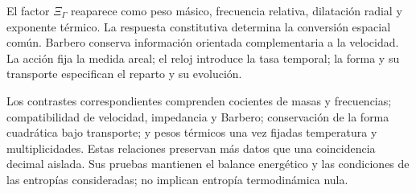 El factor $\Xi_\Gamma$ reaparece como peso másico, frecuencia relativa,
dilatación radial y exponente térmico. La respuesta constitutiva determina
la conversión espacial común. Barbero conserva información orientada
complementaria a la velocidad. La acción fija la medida areal; el reloj
introduce la tasa temporal; la forma y su transporte especifican el reparto
y su evolución.

Los contrastes correspondientes comprenden cocientes de masas y frecuencias;
compatibilidad de velocidad, impedancia y Barbero; conservación de la forma
cuadrática bajo transporte; y pesos térmicos una vez fijadas temperatura y
multiplicidades. Estas relaciones preservan más datos que una coincidencia
decimal aislada. Sus pruebas mantienen el balance energético y las
condiciones de las entropías consideradas; no implican entropía
termodinámica nula.
